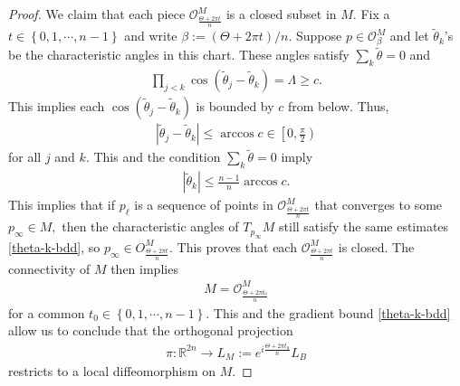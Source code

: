 \documentclass[11pt]{amsart}
\numberwithin{equation}{section}
\theoremstyle{definition}
\theoremstyle{definition}
\newcommand{\set}[1]{\left\{#1\right\}}
\newcommand{\pr}[1]{\left(#1\right)}
\newcommand{\bb}[1]{\mathbb{#1}} \newcommand{\td}[1]{\widetilde{#1}}
\begin{document}
\begin{proof}
    
    We claim that each piece $\mathcal O^M_{\frac{\Theta+2\pi t}n}$ is a closed subset in $M.$
    Fix a $t\in\set{0,1,\cdots,n-1}$ and write $\beta:=(\Theta+2\pi t)/n.$
    Suppose $p\in \mathcal O^M_\beta$ and let $\td\theta_k$'s be the characteristic angles in this chart.
    These angles satisfy $\sum_k\td\theta=0$ and
    \begin{align*}
    \prod_{j<k}\cos\pr{\td\theta_j-\td\theta_k}
    =\Lambda\ge c.
    \end{align*}
    This implies each $\cos\pr{\td\theta_j-\td\theta_k}$ is bounded by $c$ from below.
    Thus, 
    \begin{align*}
    |\td\theta_j-\td\theta_k|\le \arccos c\in \left[0, \frac\pi 2\right)
    \end{align*}
    for all $j$ and $k.$
    This and the condition $\sum_k\td\theta=0$ imply
    \begin{align}\label{theta-k-bdd}
    |\td\theta_k|\le \frac{n-1}n\arccos c.
    \end{align}
    This implies that if $p_\ell$ is a sequence of points in $\mathcal O^M_{\frac{\Theta+2\pi t}n}$ that converges to some $p_\infty\in M,$ then the characteristic angles of $T_{p_\infty}M$ still satisfy the same estimates \eqref{theta-k-bdd}, so $p_\infty\in O^M_{\frac{\Theta+2\pi t}n}.$
    This proves that each $\mathcal O^M_{\frac{\Theta+2\pi t}n}$ is closed.
    The connectivity of $M$ then implies 
    \begin{align*}
    M = \mathcal O^M_{\frac{\Theta+2\pi t_0}n}
    \end{align*}
    for a common $t_0\in\set{0,1,\cdots,n-1}.$ 
    This and the gradient bound \eqref{theta-k-bdd} allow us to conclude that the orthogonal projection 
    \begin{align*}
    \pi\colon \bb R^{2n}\to L_M:= e^{i\frac{\Theta+2\pi t_0}n} L_B
    \end{align*}
    restricts to a local diffeomorphism on $M.$
    

\end{proof}
\end{document}
